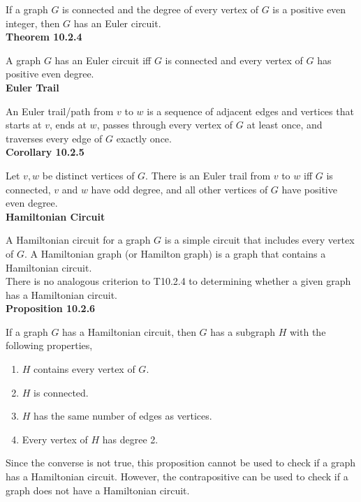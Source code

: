 \documentclass[a4paper]{article}
\newcommand{\subheading}[1]{{\scriptsize\textbf{#1}}}
\begin{document}
\begin{multicols*}{4}
If a graph $G$ is connected and the degree of every vertex of $G$ is a positive
even integer, then $G$ has an Euler circuit.\\

\subheading{Theorem 10.2.4}

A graph $G$ has an Euler circuit iff $G$ is connected and every vertex of $G$
has positive even degree.\\

\subheading{Euler Trail}

An Euler trail/path from $v$ to $w$ is a sequence of adjacent edges and
vertices that starts at $v$, ends at $w$, passes through every vertex of $G$ at
least once, and traverses every edge of $G$ exactly once.\\

\subheading{Corollary 10.2.5}

Let $v, w$ be distinct vertices of $G$. There is an Euler trail from $v$ to $w$
iff $G$ is connected, $v$ and $w$ have odd degree, and all other vertices of
$G$ have positive even degree.\\

\subheading{Hamiltonian Circuit}

A Hamiltonian circuit for a graph $G$ is a simple circuit that includes every
vertex of $G$. A Hamiltonian graph (or Hamilton graph) is a graph that contains
a Hamiltonian circuit.\\

There is no analogous criterion to T10.2.4 to determining whether a given graph
has a Hamiltonian circuit.\\

\subheading{Proposition 10.2.6}

If a graph $G$ has a Hamiltonian circuit, then $G$ has a subgraph $H$ with the
following properties,
\begin{enumerate} \itemsep -0.5em
 \item $H$ contains every vertex of $G$.
 \item $H$ is connected.
 \item $H$ has the same number of edges as vertices.
 \item Every vertex of $H$ has degree 2.
\end{enumerate}
Since the converse is not true, this proposition cannot be used to check if a
graph has a Hamiltonian circuit. However, the contrapositive can be used to
check if a graph does not have a Hamiltonian circuit.\\


\end{multicols*}
\end{document}
